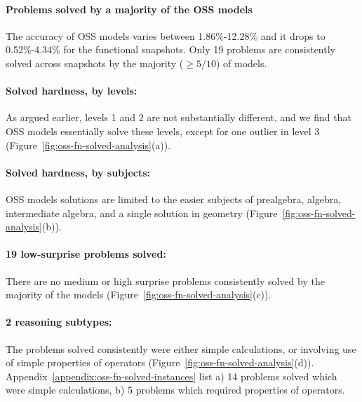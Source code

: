 \documentclass[11pt,a4paper]{article}
\begin{document}
\paragraph{Problems solved by a majority of the OSS models}
The accuracy of OSS models varies between 1.86\%-12.28\% and it drops to
0.52\%-4.34\% for the functional snapshots. Only 19 problems are consistently
solved across snapshots by the majority ($\ge 5/10$) of models.

\paragraph{Solved hardness, by levels:} As argued earlier, levels 1 and 2 are
not substantially different, and we find that OSS models essentially solve
these levels, except for one outlier in level 3
(Figure~\ref{fig:oss-fn-solved-analysis}(a)).

\paragraph{Solved hardness, by subjects:} OSS models solutions are limited to
the easier subjects of prealgebra, algebra, intermediate algebra, and a single
solution in geometry (Figure~\ref{fig:oss-fn-solved-analysis}(b)).

\paragraph{19 low-surprise problems solved:} There are no medium or high surprise
problems consistently solved by the majority of the models
(Figure~\ref{fig:oss-fn-solved-analysis}(c)).

\paragraph{2 reasoning subtypes:} The problems solved consistently were either
simple calculations, or involving use of simple properties of operators
(Figure~\ref{fig:oss-fn-solved-analysis}(d)).
Appendix~\ref{appendix:oss-fn-solved-instances} list a) 14 problems solved
which were simple calculations, b) 5 problems which required properties of
operators.
\end{document}
